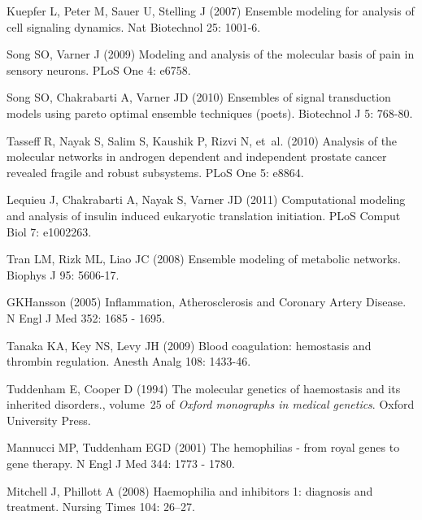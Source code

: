 \documentclass[processes,article,received,moreauthors,pdftex,12pt,a4paper]{mdpi}
\begin{document}
\begin{thebibliography}{9999}
Kuepfer L, Peter M, Sauer U, Stelling J (2007) Ensemble modeling for analysis
  of cell signaling dynamics.
\newblock Nat Biotechnol 25: 1001-6.

Song SO, Varner J (2009) Modeling and analysis of the molecular basis of pain
  in sensory neurons.
\newblock PLoS One 4: e6758.

Song SO, Chakrabarti A, Varner JD (2010) Ensembles of signal transduction
  models using pareto optimal ensemble techniques (poets).
\newblock Biotechnol J 5: 768-80.

Tasseff R, Nayak S, Salim S, Kaushik P, Rizvi N, et~al. (2010) Analysis of the
  molecular networks in androgen dependent and independent prostate cancer
  revealed fragile and robust subsystems.
\newblock PLoS One 5: e8864.

Lequieu J, Chakrabarti A, Nayak S, Varner JD (2011) Computational modeling and
  analysis of insulin induced eukaryotic translation initiation.
\newblock PLoS Comput Biol 7: e1002263.

Tran LM, Rizk ML, Liao JC (2008) Ensemble modeling of metabolic networks.
\newblock Biophys J 95: 5606-17.

GKHansson (2005) {Inflammation, Atherosclerosis and Coronary Artery Disease}.
\newblock N Engl J Med 352: 1685 - 1695.

Tanaka KA, Key NS, Levy JH (2009) Blood coagulation: hemostasis and thrombin
  regulation.
\newblock Anesth Analg 108: 1433-46.

Tuddenham E, Cooper D (1994) {The molecular genetics of haemostasis and its
  inherited disorders.}, volume~25 of \emph{Oxford monographs in medical
  genetics}.
\newblock Oxford University Press.

Mannucci MP, Tuddenham EGD (2001) The hemophilias - from royal genes to gene
  therapy.
\newblock N Engl J Med 344: 1773 - 1780.

Mitchell J, Phillott A (2008) Haemophilia and inhibitors 1: diagnosis and
  treatment.
\newblock Nursing Times 104: 26--27.


\end{thebibliography}
\end{document}
